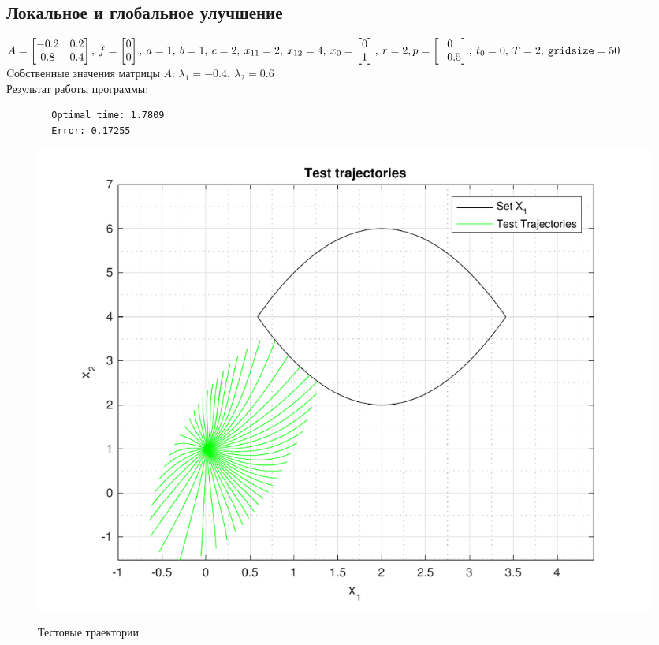 \documentclass[11pt, oneside, final]{article}
\theoremstyle{break}
\numberwithin{equation}{section}
\theoremstyle{plain}
\theoremstyle{definition}
\begin{document}
    \subsection{Локальное и глобальное улучшение}
    \(A = \begin{bmatrix} -0.2 & 0.2 \\ 0.8 & 0.4 \end{bmatrix},\:f = \begin{bmatrix} 0 \\ 0 \end{bmatrix},\: a = 1,\: b = 1,\: c = 2,\: x_{11} = 2,\: x_{12} = 4,\: x_0 =  \begin{bmatrix} 0 \\ 1 \end{bmatrix}, \: r = 2, \\ p = \begin{bmatrix} 0 \\ -0.5 \end{bmatrix}, \: t_0 = 0, \: T = 2, \: \mathtt{gridsize} = 50 \)\\
    Cобственные значения матрицы \(A\): \(\lambda_1 = -0.4, \: \lambda_2 = 0.6\)\\
    Результат работы программы: 
    \begin{verbatim}
        Optimal time: 1.7809
        Error: 0.17255
    \end{verbatim}
    \begin{figure}[H]
        \centering
        \includegraphics[width=\linewidth]{s1fig1}
        \label{pic:s1:1}
        \caption{Тестовые траектории}
    \end{figure} 
\end{document}

